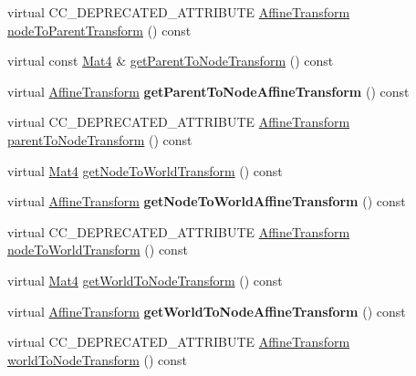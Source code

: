 \begin{Indent}
\begin{DoxyCompactItemize}
virtual C\+C\+\_\+\+D\+E\+P\+R\+E\+C\+A\+T\+E\+D\+\_\+\+A\+T\+T\+R\+I\+B\+U\+TE \hyperlink{structAffineTransform}{Affine\+Transform} \hyperlink{classNode_ab242ac36f0e26f5ef1f89e4a5fa4f02c}{node\+To\+Parent\+Transform} () const
\item 
virtual const \hyperlink{classMat4}{Mat4} \& \hyperlink{classNode_a079a813e52c5b8a2d4f0c4bd5fa90a91}{get\+Parent\+To\+Node\+Transform} () const
\item 
\mbox{\label{classNode_a7689ecef478afa3ddad8bc311ed345fd}} 
virtual \hyperlink{structAffineTransform}{Affine\+Transform} {\bfseries get\+Parent\+To\+Node\+Affine\+Transform} () const
\item 
virtual C\+C\+\_\+\+D\+E\+P\+R\+E\+C\+A\+T\+E\+D\+\_\+\+A\+T\+T\+R\+I\+B\+U\+TE \hyperlink{structAffineTransform}{Affine\+Transform} \hyperlink{classNode_af309d9c24935db52112193619f3cd790}{parent\+To\+Node\+Transform} () const
\item 
virtual \hyperlink{classMat4}{Mat4} \hyperlink{classNode_ae2cede05ce1912aea7903ce17dbebd86}{get\+Node\+To\+World\+Transform} () const
\item 
\mbox{\label{classNode_af9208691f25a357a4dfe739cc54d8e5c}} 
virtual \hyperlink{structAffineTransform}{Affine\+Transform} {\bfseries get\+Node\+To\+World\+Affine\+Transform} () const
\item 
virtual C\+C\+\_\+\+D\+E\+P\+R\+E\+C\+A\+T\+E\+D\+\_\+\+A\+T\+T\+R\+I\+B\+U\+TE \hyperlink{structAffineTransform}{Affine\+Transform} \hyperlink{classNode_a26eeb65a02646d8bbe366c9885893a75}{node\+To\+World\+Transform} () const
\item 
virtual \hyperlink{classMat4}{Mat4} \hyperlink{classNode_a2128a1876b3f14c6270bbf0a9010a572}{get\+World\+To\+Node\+Transform} () const
\item 
\mbox{\label{classNode_a531808b4dd0d7d1052935246585f8bb4}} 
virtual \hyperlink{structAffineTransform}{Affine\+Transform} {\bfseries get\+World\+To\+Node\+Affine\+Transform} () const
\item 
virtual C\+C\+\_\+\+D\+E\+P\+R\+E\+C\+A\+T\+E\+D\+\_\+\+A\+T\+T\+R\+I\+B\+U\+TE \hyperlink{structAffineTransform}{Affine\+Transform} \hyperlink{classNode_a0b6b4ad592891ca7ec7ec0bd09341dd1}{world\+To\+Node\+Transform} () const
\end{DoxyCompactItemize}
\end{Indent}
